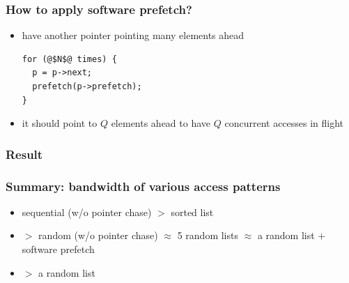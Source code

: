 \documentclass[12pt,dvipdfmx]{beamer}
\begin{document}
\begin{frame}[fragile]
\frametitle{How to apply software prefetch?}
\begin{itemize}
\item have another pointer pointing many elements ahead
\begin{lstlisting}
for (@$N$@ times) {
  p = p->next;
  prefetch(p->prefetch);
}
\end{lstlisting}

\item it should point to 
  $Q$ elements ahead to have $Q$ concurrent accesses in flight
\end{itemize}

\begin{center}
\def\svgwidth{\textwidth}
{\scriptsize}
\end{center}
\end{frame}

\begin{frame}[fragile]
\frametitle{Result}

\begin{center}
  {\scriptsize}
\end{center}
\end{frame}

\begin{frame}
\frametitle{Summary: bandwidth of various access patterns}

\begin{itemize}
\item sequential (w/o pointer chase) $>$ sorted list
\item [] $>$ random (w/o pointer chase) 
$\approx$ 5 random lists $\approx$ a random list $+$ software prefetch
\item [] $>$ a random list
\end{itemize}

\begin{center}
  {\scriptsize}
\end{center}
\end{frame}
\end{document}
